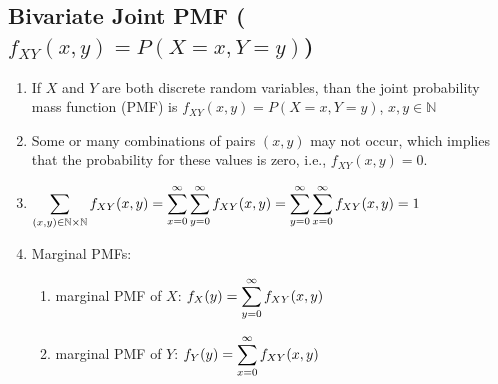 \subsection{Bivariate Joint PMF ($f _{X Y} (x, y) = P(X = x, Y = y)$)}

\begin{enumerate}
    \item If $X$ and $Y$ are both discrete random variables, than the joint probability mass function (PMF) is $f _{X Y} (x, y) = P(X = x, Y = y)$, $x, y\in \mathbb{N}$
    \hfill \cite{statistics/book/Statistics-for-Data-Scientists/Maurits-Kaptein}

    \item Some or many combinations of pairs $(x, y)$ may not occur, which implies that the probability for these values is zero, i.e., $f _{X Y} (x, y) = 0$.
    \hfill \cite{statistics/book/Statistics-for-Data-Scientists/Maurits-Kaptein}

    \item
    $
        \displaystyle\sum _{(x,y)\in \mathbb{N}\times \mathbb{N}} f _{X Y} (x, y)
        = \displaystyle\sum^\infty _{x=0} \displaystyle\sum^\infty _{y=0} f _{X Y} (x, y)
        = \displaystyle\sum^\infty _{y=0} \displaystyle\sum^\infty _{x=0} f _{X Y} (x, y)
        = 1
    $
    \hfill \cite{statistics/book/Statistics-for-Data-Scientists/Maurits-Kaptein}

    \item Marginal PMFs:
    \begin{enumerate}
        \item marginal PMF of $X$: $f _X (y) = \displaystyle\sum^\infty _{y=0} f _{X Y} (x, y)$
        \hfill \cite{statistics/book/Statistics-for-Data-Scientists/Maurits-Kaptein}

        \item marginal PMF of $Y$: $f _Y (y) = \displaystyle\sum^\infty _{x=0} f _{X Y} (x, y)$
        \hfill \cite{statistics/book/Statistics-for-Data-Scientists/Maurits-Kaptein}
    \end{enumerate}


\end{enumerate}
